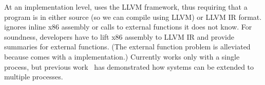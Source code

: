 At an implementation level, \peregrine uses the LLVM framework, thus requiring
that a program is in either source (so we can compile using LLVM) or LLVM
IR format.  \peregrine ignores inline x86 assembly or calls to external
functions it does not know.  For soundness, developers have to lift x86
assembly to LLVM IR and provide summaries for external functions.  (The
external function problem is alleviated because \klee comes with a
 implementation.)  Currently \peregrine works only with a single process,
but previous work~\cite{dos:osdi10} has demonstrated how \dmt systems can
be extended to multiple processes.








